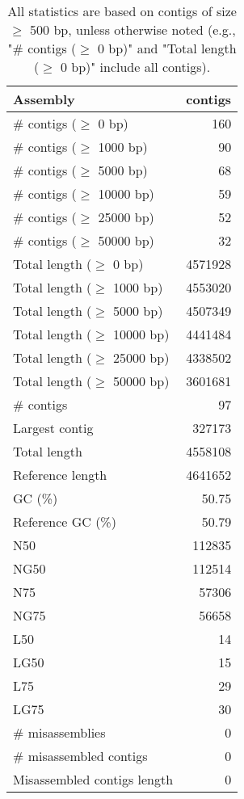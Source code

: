 \documentclass[12pt,a4paper]{article}
\begin{document}
\begin{table}[ht]
\begin{center}
\caption{All statistics are based on contigs of size $\geq$ 500 bp, unless otherwise noted (e.g., "\# contigs ($\geq$ 0 bp)" and "Total length ($\geq$ 0 bp)" include all contigs).}
\begin{tabular}{|l*{1}{|r}|}
\hline
Assembly & contigs \\ \hline
\# contigs ($\geq$ 0 bp) & 160 \\ \hline
\# contigs ($\geq$ 1000 bp) & 90 \\ \hline
\# contigs ($\geq$ 5000 bp) & 68 \\ \hline
\# contigs ($\geq$ 10000 bp) & 59 \\ \hline
\# contigs ($\geq$ 25000 bp) & 52 \\ \hline
\# contigs ($\geq$ 50000 bp) & 32 \\ \hline
Total length ($\geq$ 0 bp) & 4571928 \\ \hline
Total length ($\geq$ 1000 bp) & 4553020 \\ \hline
Total length ($\geq$ 5000 bp) & 4507349 \\ \hline
Total length ($\geq$ 10000 bp) & 4441484 \\ \hline
Total length ($\geq$ 25000 bp) & 4338502 \\ \hline
Total length ($\geq$ 50000 bp) & 3601681 \\ \hline
\# contigs & 97 \\ \hline
Largest contig & 327173 \\ \hline
Total length & 4558108 \\ \hline
Reference length & 4641652 \\ \hline
GC (\%) & 50.75 \\ \hline
Reference GC (\%) & 50.79 \\ \hline
N50 & 112835 \\ \hline
NG50 & 112514 \\ \hline
N75 & 57306 \\ \hline
NG75 & 56658 \\ \hline
L50 & 14 \\ \hline
LG50 & 15 \\ \hline
L75 & 29 \\ \hline
LG75 & 30 \\ \hline
\# misassemblies & 0 \\ \hline
\# misassembled contigs & 0 \\ \hline
Misassembled contigs length & 0 \\ \hline

\end{tabular}
\end{center}
\end{table}
\end{document}
